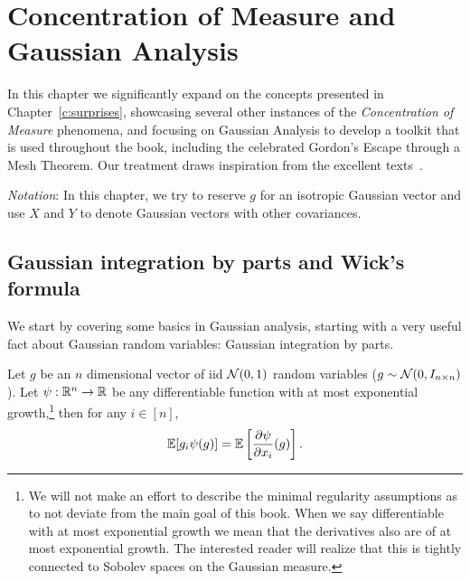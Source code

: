 \chapter{Concentration of Measure and Gaussian Analysis}
\label{c:probability-gaussiananalysis}


In this chapter we significantly expand on the concepts presented in Chapter~\ref{c:surprises}, showcasing several other instances of the \emph{Concentration of Measure} phenomena, and focusing on Gaussian Analysis to develop a toolkit that is used throughout the book, including the celebrated Gordon's Escape through a Mesh Theorem. Our treatment draws inspiration from the excellent texts~\cite{vanHandel_LectureNotesProb_14,Ramon-StFlour-2022}.

\emph{Notation}: In this chapter, we try to reserve $g$ for an isotropic Gaussian vector and use $X$ and $Y$ to denote Gaussian vectors with other covariances.



\section{Gaussian integration by parts and Wick's formula}

We start by covering some basics in Gaussian analysis, starting with a very useful fact about Gaussian random variables: Gaussian integration by parts.

\begin{lemma}\label{lemma:GIbP}
Let $g$ be an $n$ dimensional vector of iid $\mathcal{N}(0,1)$ random variables ($g\sim\mathcal{N}(0,I_{n\times n})$). Let $\psi:\mathbb{R}^n\to\mathbb{R}$ be any differentiable function with at most exponential growth,\footnote{We will not make an effort to describe the minimal regularity assumptions as to not deviate from the main goal of this book. When we say differentiable with at most exponential growth we mean that the derivatives also are of at most exponential growth. The interested reader will realize that this is tightly connected to Sobolev spaces on the Gaussian measure.} then for any $i\in[n]$,
\[
\mathbb{E}[g_i \psi(g)] = \mathbb{E}\left[ \frac{\partial \psi}{\partial x_i}(g) \right].
\]
\end{lemma}

